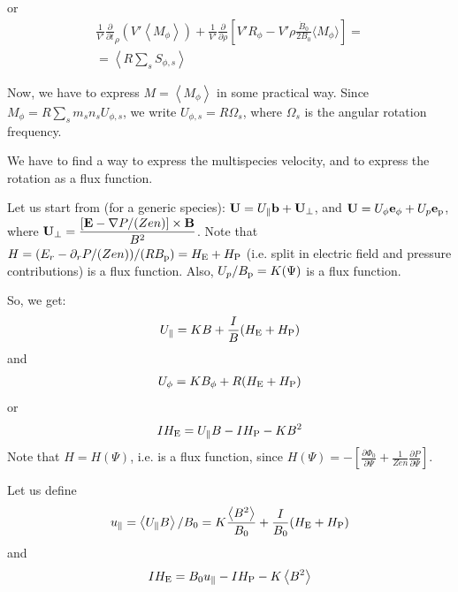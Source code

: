 or
\begin{eqnarray}
\frac{1}{V'} \frac{\partial }{\partial{t}}_{\rho}\left(V' \left\langle M_\phi \right\rangle\right) +\frac{1}{V'}  \frac{\partial}{\partial \rho}\left[ V' R_{\phi}
-V'\rho\frac{\dot{B}_0}{2 B_0}\langle  M_\phi \rangle \right]
=\nonumber \\ 
=\left\langle R \sum_s S_{\phi,s}\right\rangle
\label{momtranspeq3drephiFSArho}
\end{eqnarray}

Now, we have to express $M= \left\langle M_\phi \right\rangle$ in some practical way. Since $\displaystyle  M_\phi = R \sum_s m_s n_s U_{\phi,s}$, we write $U_{\phi,s}=R\Omega_s$, where $\Omega_s$ is the angular rotation frequency.

We have to find a way to express the multispecies velocity, and to express the rotation as a flux function.

Let us start from (for a generic species): $\mathbf{U}=U_\parallel \mathbf{b}+\mathbf{U}_{\perp}$, and $\mathbf{U}=U_\phi \mathbf{e}_{\phi} + U_p \mathbf{e}_{\rm p}$, where
$\displaystyle \mathbf{U}_{\perp}=\frac{\left[\mathbf{E}-\nabla{P}/(Zen)\right]\times\mathbf{B}}{B^2}$.
Note that $H=(E_r-\partial_r P /(Zen))/(R B_{\rm p})=H_{\rm E}+H_{\rm P}$ (i.e. split in electric field and pressure contributions) is a flux function. Also, $U_p/B_{\rm p}=K(\Psi)$ is a flux function.

So, we get:
\begin{eqnarray}
U_\parallel = K B + \frac{I}{B} (H_{\rm E}+H_{\rm P})
\label{uparperp1}
\end{eqnarray}
and
\begin{eqnarray}
U_\phi = K B_\phi + R (H_{\rm E}+H_{\rm P})
\label{uparperp1}
\end{eqnarray}
or
\begin{eqnarray}
 I H_{\rm E}=U_\parallel B-I  H_{\rm P}-K B^2
\label{uparperp2}
\end{eqnarray}
Note that $H = H(\Psi)$, i.e. is a flux function, since $\displaystyle H(\Psi)=-\left[\frac{\partial\Phi_0}{\partial \Psi}+\frac{1}{Zen}\frac{\partial{P}}{\partial{\Psi}}\right]$. 

Let us define 
\begin{eqnarray}
u_\parallel=\left\langle U_\parallel B \right\rangle/B_0 = K \frac{\left\langle B^2 \right\rangle}{B_0}+\frac{I}{B_0}(H_{\rm E}+H_{\rm P})
\label{uparfsadef}
\end{eqnarray}
and
\begin{eqnarray}
 I H_{\rm E}=B_0 u_\parallel-I  H_{\rm P}-K \left\langle B^2 \right\rangle
\label{uparfsadef2}
\end{eqnarray}

